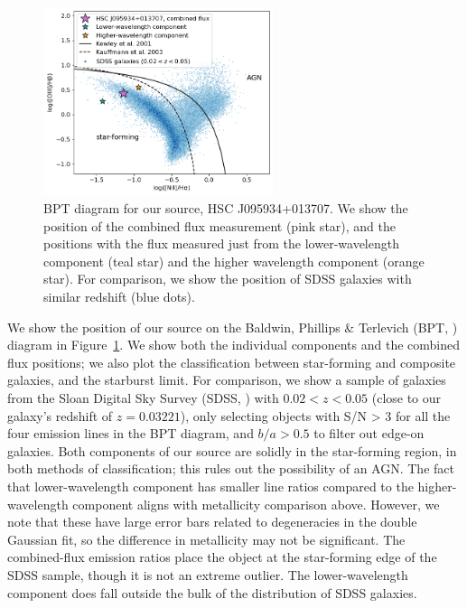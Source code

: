 \begin{figure}
    \centering
    \includegraphics[width=0.6\textwidth]{bpt}
    \caption{BPT diagram for our source, HSC J095934+013707. We show the position of the combined flux measurement (pink star), and the positions with the flux measured just from the lower-wavelength component (teal star) and the higher wavelength component (orange star). For comparison, we show the position of SDSS galaxies with similar redshift (blue dots).}
    \label{fig:bpt}
\end{figure}

We show the position of our source on the Baldwin, Phillips \& Terlevich (BPT, \citealt{Baldwin1981}) diagram in Figure~\ref{fig:bpt}.
We show both the individual components and the combined flux positions; we also plot the \cite{Kauffmann2003} classification between star-forming and composite galaxies, and the \cite{Kewley2001} starburst limit.
For comparison, we show a sample of galaxies from the Sloan Digital Sky Survey (SDSS, \citealt{York2000}) with $0.02<z<0.05$ (close to our galaxy's redshift of $z=0.03221$), only selecting objects with S/N > 3 for all the four emission lines in the BPT diagram, and $b/a > 0.5$ to filter out edge-on galaxies.
Both components of our source are solidly in the star-forming region, in both methods of classification; this rules out the possibility of an AGN.
The fact that lower-wavelength component has smaller line ratios compared to the higher-wavelength component aligns with metallicity comparison above.
However, we note that these have large error bars related to degeneracies in the double Gaussian fit, so the difference in metallicity may not be significant.
The combined-flux emission ratios place the object at the star-forming edge of the SDSS sample, though it is not an extreme outlier.
The lower-wavelength component does fall outside the bulk of the distribution of SDSS galaxies.

